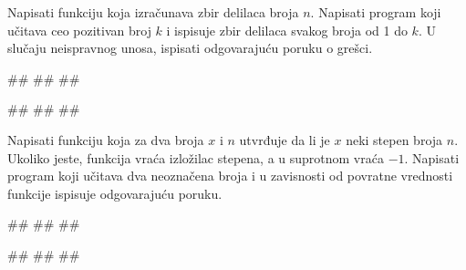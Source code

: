 \begin{Exercise}[label=FUN_03] 
 Napisati funkciju  koja izračunava
 zbir delilaca broja $n$. Napisati program koji učitava ceo pozitivan broj $k$ i
 ispisuje zbir delilaca svakog broja od 1 do $k$.
U slučaju neispravnog unosa, ispisati odgovarajuću poruku o grešci.

\begin{miditest}
\begin{upotreba}{1}
#\naslovInt#
##
##
\end{upotreba}
\end{miditest}
\begin{miditest}
\begin{upotreba}{2}
#\naslovInt#
##
##
\end{upotreba}
\end{miditest}

\end{Exercise}
\ifresenja 
\begin{Answer}[ref=FUN_03]
\end{Answer} 
\fi


\begin{Exercise}[label=FUN_04] 
Napisati funkciju  koja
za dva broja $x$ i $n$ utvrđuje da li je $x$ neki stepen broja
$n$. Ukoliko jeste, funkcija vraća izložilac stepena, a u suprotnom
vraća $-1$. Napisati program koji učitava dva neoznačena broja i u zavisnosti 
od povratne vrednosti funkcije ispisuje odgovarajuću poruku.

\begin{miditest}
\begin{upotreba}{1}
#\naslovInt#
##
##
\end{upotreba}
\end{miditest}
\begin{miditest}
\begin{upotreba}{2}
#\naslovInt#
##
##
\end{upotreba}
\end{miditest}

\end{Exercise}
\ifresenja 
\begin{Answer}[ref=FUN_04]
\end{Answer} 
\fi



